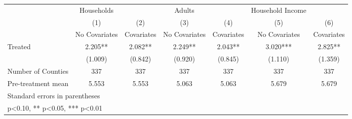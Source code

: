 {
\def\sym#1{\ifmmode^{#1}\else\(^{#1}\)\fi}
\begin{tabular}{l*{6}{c}}
\hline\hline
            &  Households   &               &      Adults   &               &Household Income   &               \\
            &\multicolumn{1}{c}{(1)}&\multicolumn{1}{c}{(2)}&\multicolumn{1}{c}{(3)}&\multicolumn{1}{c}{(4)}&\multicolumn{1}{c}{(5)}&\multicolumn{1}{c}{(6)}\\
            &\multicolumn{1}{c}{No Covariates}&\multicolumn{1}{c}{Covariates}&\multicolumn{1}{c}{No Covariates}&\multicolumn{1}{c}{Covariates}&\multicolumn{1}{c}{No Covariates}&\multicolumn{1}{c}{Covariates}\\
\hline
Treated     &       2.205** &       2.082** &       2.249** &       2.043** &       3.020***&       2.825** \\
            &     (1.009)   &     (0.842)   &     (0.920)   &     (0.845)   &     (1.110)   &     (1.359)   \\
\hline
Number of Counties&         337   &         337   &         337   &         337   &         337   &         337   \\
Pre-treatment mean&       5.553   &       5.553   &       5.063   &       5.063   &       5.679   &       5.679   \\
\hline\hline
\multicolumn{7}{l}{\footnotesize Standard errors in parentheses}\\
\multicolumn{7}{l}{\footnotesize * p<0.10, ** p<0.05, *** p<0.01}\\
\end{tabular}
}
